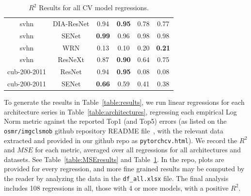 \begin{table}[t]
\begin{center}
\begin{tabular}{|c|c|c|c|c|c|}
 svhn & DIA-ResNet  & 0.94 &  \textbf{0.95} & 0.78 & 0.77 \\
 svhn & SENet  & \textbf{0.99} &  0.96 & 0.98 & 0.98 \\
 svhn & WRN  & 0.13 &  0.10 & 0.20 & \textbf{0.21} \\
 svhn & ResNeXt  & 0.87 &  \textbf{0.90} & 0.64 & 0.75 \\
\hline
 cub-200-2011 & ResNet  & 0.94 &  \textbf{0.95} & 0.08 & 0.08 \\
 cub-200-2011 & SENet  & \textbf{0.66} &  0.59 & 0.41 & 0.38 \\
\hline
\end{tabular}
\end{center}
\caption{$R^{2}$ Results for all CV model regressions. }
\label{table:R2results}
\end{table}

To generate the results in Table~\ref{table:results}, we run linear regressions for each architecture series in Table~\ref{table:architectures}, regressing each empirical Log Norm metric against the reported Top1 (and Top5) errors (as listed on the \texttt{osmr/imgclsmob} github repository README file~\cite{osmr}, with the relevant data extracted and provided in our github repo as \texttt{pytorchcv.html}).
We record the $R^{2}$ and $MSE$ for each metric, averaged over all regressions for all architectures and datasets.
See Table~\ref{table:MSEresults} and Table~\ref{table:R2results}.
In the repo, plots are provided for every regression, and more fine grained results may be computed by the reader by analyzing the data in the \texttt{df\_all.xlsx} file.
The final analysis includes 108 regressions in all, those with 4 or more models, with a positive $R^2$.

